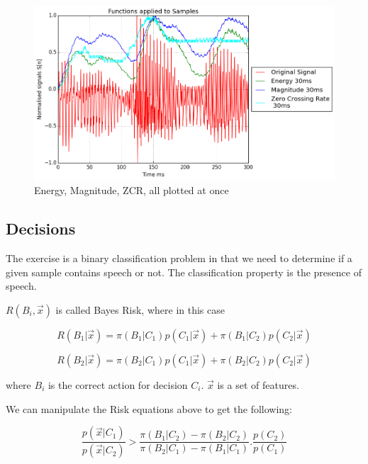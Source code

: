 \documentclass[a4paper]{article}
\begin{document}
\begin{figure}[H]
\begin{center}
\includegraphics[width=\textwidth, height=\textheight, keepaspectratio]{images/signals.png}
\caption{Energy, Magnitude, ZCR, all plotted at once }
\end{center}
\end{figure}



\subsection{Decisions}

The exercise is a binary classification problem in that we need to determine
if a given sample contains speech or not. The classification property is the 
presence of speech.

$R(B_i,\vec x)$ is called Bayes Risk, where in this case 

\begin{equation}
R(B_1|\vec x) = \pi(B_1|C_1)p(C_1|\vec x) + \pi(B_1|C_2)p(C_2|\vec x) 
\end{equation}

\begin{equation}
R(B_2|\vec x) = \pi(B_2|C_1)p(C_1|\vec x) + \pi(B_2|C_2)p(C_2|\vec x) 
\end{equation}

where $B_i$ is the correct action for decision $C_i$.
$\vec x$ is a set of features.


We can manipulate the Risk equations above to get the following:

\begin{equation}
\frac{p(\vec x|C_1)}{p(\vec x|C_2)} > \frac{\pi(B_1|C_2) - \pi(B_2|C_2)}{\pi(B_2|C_1) - \pi(B_1|C_1)}.\frac{p(C_2)}{p(C_1)} 
\end{equation}
\end{document}

